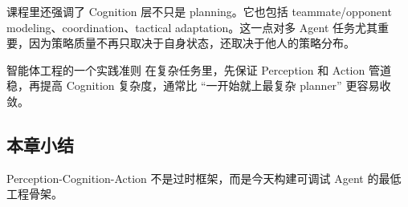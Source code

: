 课程里还强调了 Cognition 层不只是 planning。它也包括 teammate/opponent modeling、coordination、tactical adaptation。这一点对多 Agent 任务尤其重要，因为策略质量不再只取决于自身状态，还取决于他人的策略分布。

\begin{importantbox}{智能体工程的一个实践准则}
在复杂任务里，先保证 Perception 和 Action 管道稳，再提高 Cognition 复杂度，通常比 ``一开始就上最复杂 planner'' 更容易收敛。
\end{importantbox}

\subsection{本章小结}
Perception-Cognition-Action 不是过时框架，而是今天构建可调试 Agent 的最低工程骨架。

